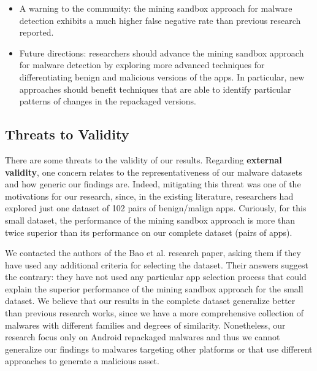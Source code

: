\begin{itemize}
  \item A warning to the community: the mining sandbox approach for malware detection exhibits a much higher false negative rate  than previous research reported. 

  \item Future directions: researchers should advance the mining sandbox approach for malware detection by exploring more advanced techniques for differentiating
    benign and malicious versions of the apps. In particular, new approaches should benefit techniques that are able to identify particular patterns of changes
    in the repackaged versions. 
\end{itemize}  


\subsection{Threats to Validity}\label{sec:threats}


There are some threats to the validity of our results.
Regarding {\bf external validity}, one concern relates to the 
representativeness of our malware datasets and how generic our findings are.
Indeed, mitigating this threat was one of the motivations for our research,
since, in the existing literature, researchers had explored just
one dataset of 102 pairs of benign/malign apps. Curiously,
for this small dataset, the performance of the
mining sandbox approach is more than twice superior
than its performance on our complete dataset (\apps pairs of
apps).

We contacted the authors of the Bao et al. research paper, asking them
if they have used any additional criteria for selecting the
dataset. Their answers suggest the contrary: they have not used
any particular app selection process that
could explain the superior performance of the mining
sandbox approach for the small dataset. We believe that
our results in the complete dataset generalize better than previous research works,
since we have a more comprehensive collection of malwares with different
families and degrees of similarity. Nonetheless, our
research focus only on Android repackaged malwares and thus we
cannot generalize our findings to malwares targeting
other platforms or that use different approaches to
generate a malicious asset.



